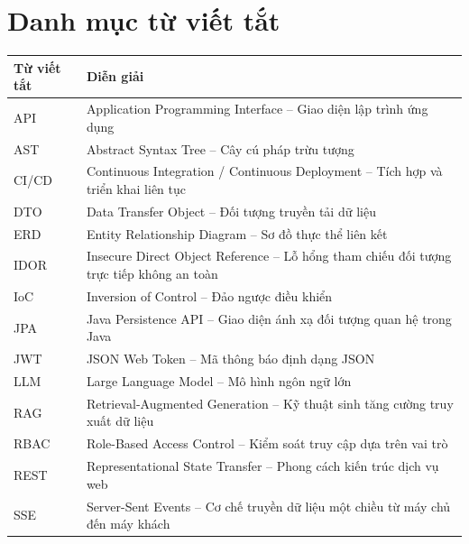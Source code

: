 \documentclass[12pt,a4paper]{report}
\begin{document}
\tableofcontents
\cleardoublepage

\listoffigures
\cleardoublepage

\listoftables
\cleardoublepage

\chapter*{Danh mục từ viết tắt}

\begin{table}[H]
\centering
\renewcommand{\arraystretch}{1.2}
\begin{tabular}{|p{2.5cm}|p{11.5cm}|}
\hline
\textbf{Từ viết tắt} & \textbf{Diễn giải} \\ \hline
API & Application Programming Interface -- Giao diện lập trình ứng dụng \\ \hline
AST & Abstract Syntax Tree -- Cây cú pháp trừu tượng \\ \hline
CI/CD & Continuous Integration / Continuous Deployment -- Tích hợp và triển khai liên tục \\ \hline
DTO & Data Transfer Object -- Đối tượng truyền tải dữ liệu \\ \hline
ERD & Entity Relationship Diagram -- Sơ đồ thực thể liên kết \\ \hline
IDOR & Insecure Direct Object Reference -- Lỗ hổng tham chiếu đối tượng trực tiếp không an toàn \\ \hline
IoC & Inversion of Control -- Đảo ngược điều khiển \\ \hline
JPA & Java Persistence API -- Giao diện ánh xạ đối tượng quan hệ trong Java \\ \hline
JWT & JSON Web Token -- Mã thông báo định dạng JSON \\ \hline
LLM & Large Language Model -- Mô hình ngôn ngữ lớn \\ \hline
RAG & Retrieval-Augmented Generation -- Kỹ thuật sinh tăng cường truy xuất dữ liệu \\ \hline
RBAC & Role-Based Access Control -- Kiểm soát truy cập dựa trên vai trò \\ \hline
REST & Representational State Transfer -- Phong cách kiến trúc dịch vụ web \\ \hline
SSE & Server-Sent Events -- Cơ chế truyền dữ liệu một chiều từ máy chủ đến máy khách \\ \hline
\end{tabular}
\end{table}
\cleardoublepage
\end{document}
